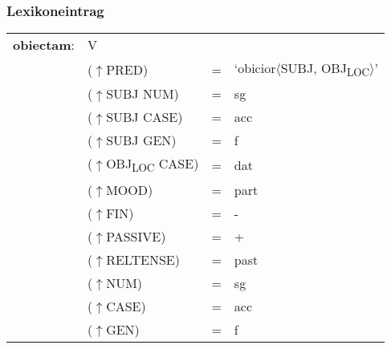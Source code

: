 \documentclass[12pt,a4paper]{article}
\begin{document}
\subsubsection{Lexikoneintrag}
\begin{singlespace}
\begin{tabular}{ l  l  l  l  } 
\textbf{obiectam}: &  \: V \\
$\qquad$ & \:  ($\uparrow$PRED) & = & `obicior$\langle$SUBJ, OBJ\textsubscript{LOC}$\rangle$'\\
$\qquad$ & \:  ($\uparrow$SUBJ NUM) & = & sg \\
$\qquad$ & \: ($\uparrow$SUBJ CASE) & = & acc \\
$\qquad$ & \: ($\uparrow$SUBJ GEN) & = & f \\
$\qquad$ & \: ($\uparrow$OBJ\textsubscript{LOC} CASE) & = & dat \\
$\qquad$ & \:  ($\uparrow$MOOD) & = & part\\
$\qquad$ & \:  ($\uparrow$FIN) & = & - \\
$\qquad$ & \:  ($\uparrow$PASSIVE) & = & + \\
$\qquad$ & \:  ($\uparrow$RELTENSE) & = & past \\
$\qquad$ & \:  ($\uparrow$NUM) & = & sg \\
$\qquad$ & \: ($\uparrow$CASE) & = & acc \\
$\qquad$ & \: ($\uparrow$GEN) & = & f \\
\end{tabular}
\newline
\newline
\newline
\end{singlespace}
\end{document}
